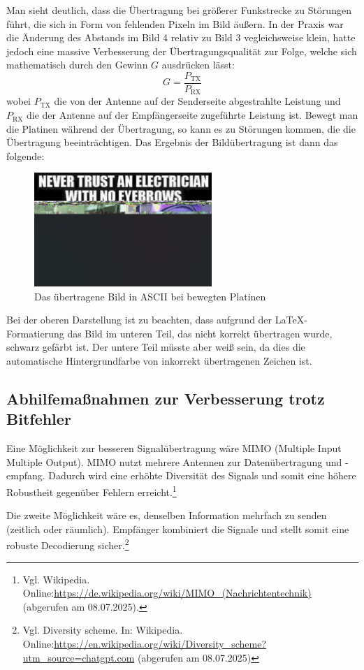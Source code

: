 Man sieht deutlich, dass die Übertragung bei größerer Funkstrecke zu Störungen führt, die sich in Form von fehlenden Pixeln im Bild äußern. 
In der Praxis war die Änderung des Abstands im Bild 4 relativ zu Bild 3 vegleichsweise klein, hatte jedoch eine massive Verbesserung der Übertragungsqualität zur Folge, 
welche sich mathematisch durch den Gewinn $G$ ausdrücken lässt: 
\begin{equation}
    G = \frac{P_\text{TX}}{P_\text{RX}}
\end{equation}
wobei $P_\text{TX}$ die von der Antenne auf der Senderseite abgestrahlte Leistung und $P_\text{RX}$ die der Antenne auf der Empfängerseite zugeführte Leistung ist.
\clearpage
Bewegt man die Platinen während der Übertragung, so kann es zu Störungen kommen, die die Übertragung beeinträchtigen. Das Ergebnis der Bildübertragung ist dann das folgende:
\begin{figure}[H]
    \centering
    \includegraphics[width=0.6\textwidth]{Pictures/memeASCIIbewegt.jpg}
    \caption{Das übertragene Bild in ASCII bei bewegten Platinen}
    \label{fig:Task2e}
\end{figure}
Bei der oberen Darstellung ist zu beachten, dass aufgrund der LaTeX-Formatierung das Bild im unteren Teil, das nicht korrekt übertragen wurde, schwarz gefärbt ist. Der untere Teil müsste aber weiß sein, da dies die automatische Hintergrundfarbe von inkorrekt übertragenen Zeichen ist. 

\subsection{Abhilfemaßnahmen zur Verbesserung trotz Bitfehler}
Eine Möglichkeit zur besseren Signalübertragung wäre MIMO (Multiple Input Multiple Output). MIMO nutzt mehrere Antennen zur Datenübertragung und -empfang. Dadurch wird eine erhöhte Diversität des Signals und somit eine höhere Robustheit gegenüber Fehlern erreicht.\footnote{Vgl. Wikipedia. Online:\url{https://de.wikipedia.org/wiki/MIMO_(Nachrichtentechnik)} (abgerufen am 08.07.2025).}

Die zweite Möglichkeit wäre es, denselben Information mehrfach zu senden (zeitlich oder räumlich). Empfänger kombiniert die Signale und stellt somit eine robuste Decodierung sicher.\footnote{Vgl. Diversity scheme. In: Wikipedia. Online:\url{https://en.wikipedia.org/wiki/Diversity_scheme?utm_source=chatgpt.com} (abgerufen am 08.07.2025)}